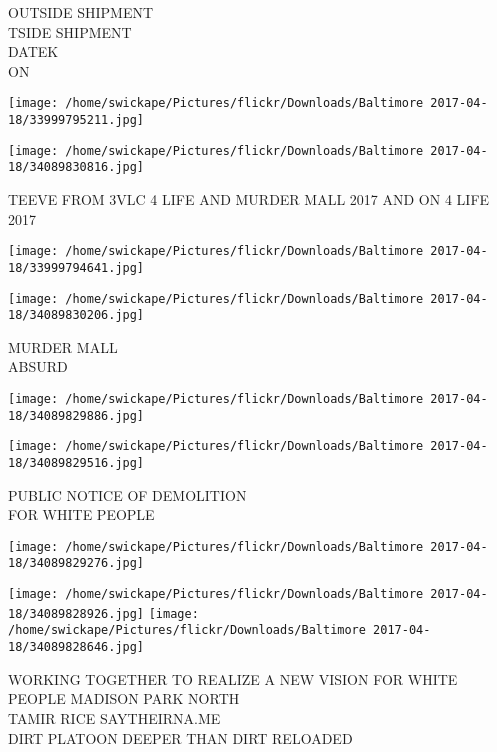 \documentclass[10pt,letterpaper]{article}
\begin{document}
OUTSIDE SHIPMENT\\
TSIDE SHIPMENT\\
DATEK\\
ON\\
\pagebreak

\texttt{[image: /home/swickape/Pictures/flickr/Downloads/Baltimore 2017-04-18/33999795211.jpg]}

\vspace{0.25in}
\texttt{[image: /home/swickape/Pictures/flickr/Downloads/Baltimore 2017-04-18/34089830816.jpg]}

TEEVE FROM 3VLC 4 LIFE AND MURDER MALL 2017 AND ON 4 LIFE\\
2017\\
\pagebreak

\texttt{[image: /home/swickape/Pictures/flickr/Downloads/Baltimore 2017-04-18/33999794641.jpg]}

\vspace{0.25in}
\texttt{[image: /home/swickape/Pictures/flickr/Downloads/Baltimore 2017-04-18/34089830206.jpg]}

MURDER MALL\\
ABSURD\\
\pagebreak

\texttt{[image: /home/swickape/Pictures/flickr/Downloads/Baltimore 2017-04-18/34089829886.jpg]}

\vspace{0.25in}
\texttt{[image: /home/swickape/Pictures/flickr/Downloads/Baltimore 2017-04-18/34089829516.jpg]}

PUBLIC NOTICE OF DEMOLITION\\
FOR WHITE PEOPLE\\
\pagebreak

\texttt{[image: /home/swickape/Pictures/flickr/Downloads/Baltimore 2017-04-18/34089829276.jpg]}

\vspace{0.25in}
\texttt{[image: /home/swickape/Pictures/flickr/Downloads/Baltimore 2017-04-18/34089828926.jpg]}
\texttt{[image: /home/swickape/Pictures/flickr/Downloads/Baltimore 2017-04-18/34089828646.jpg]}

WORKING TOGETHER TO REALIZE A NEW VISION FOR WHITE PEOPLE MADISON PARK NORTH\\
TAMIR RICE SAYTHEIRNA.ME\\
DIRT PLATOON DEEPER THAN DIRT RELOADED\\
\pagebreak
\end{document}
